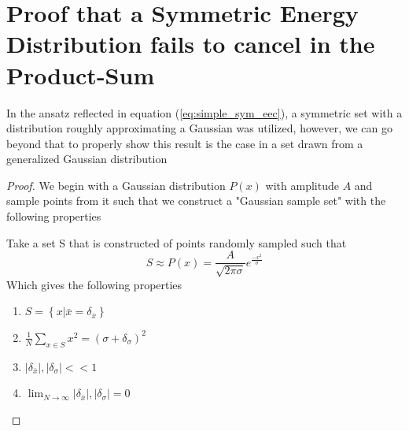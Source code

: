 \chapter{Proof that a Symmetric Energy Distribution fails to cancel in the Product-Sum}
\label{ch:symm_sample}
	In the ansatz reflected in equation (\ref{eq:simple_sym_eec}), a symmetric set with a distribution roughly approximating a Gaussian was utilized, however, we can go beyond that to properly show this result is the case in a set drawn from a generalized Gaussian distribution
	\newline
	\begin{proof}{}
		We begin with a Gaussian distribution $P(x)$ with amplitude $A$ and sample points from it such that we construct a "Gaussian sample set" with the following properties 
		\newline
		\begin{definition}
		\label{def:GSS}
		Take a set S that is constructed of points randomly sampled such that  
		\begin{equation}
			S \approx P(x)=  \frac{A}{\sqrt{2 \pi \sigma}} e^\frac{-x^2}{\sigma}
		\end{equation}
		Which gives the following properties
		\begin{enumerate}
		\item{ $ S= \left\{ x | \bar{x} = \delta_{\bar{x}} \right\}$} 
		\item{ $ \frac{1}{N} \sum_{x\in S} x^2 = \left( \sigma + \delta_\sigma \right)^2$}
		\item{ $ \left| \delta_{\bar{x}} \right|, \left| \delta_\sigma \right| << 1 $}
		\item{ $\lim_{N\rightarrow \infty} \left| \delta_{\bar{x}} \right|, \left| \delta_\sigma \right| = 0 $}
		\end{enumerate}
		
		\end{definition}
		

\end{proof}
